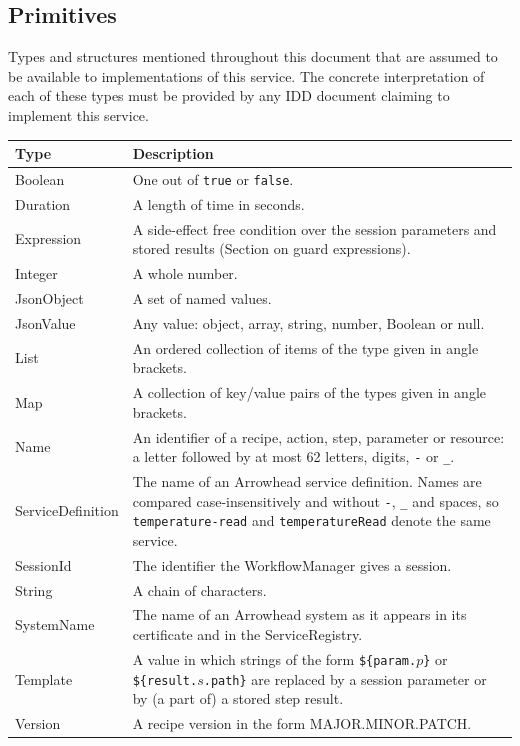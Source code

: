\documentclass[a4paper]{arrowhead}
\newcommand{\pdef}[1]{{\textcolor{ArrowheadGrey}{#1\label{sec:model:primitives:#1}\label{sec:model:primitives:#1s}\label{sec:model:primitives:#1es}}}}
\begin{document}
\subsection{Primitives}
\label{sec:model:primitives}
Types and structures mentioned throughout this document that are assumed to be available to implementations of this
service. The concrete interpretation of each of these types must be provided by any IDD document claiming to implement
this service.

{\small
\begin{longtable}{|p{3.2cm}|p{12.6cm}|}

\hline
\rowcolor{gray!33} Type & Description \\ \hline
\endhead
\pdef{Boolean} & One out of \texttt{true} or \texttt{false}. \\ \hline
\pdef{Duration} & A length of time in seconds. \\ \hline
\pdef{Expression} & A side-effect free condition over the session parameters and stored results (Section on guard expressions). \\ \hline
\pdef{Integer} & A whole number. \\ \hline
\pdef{JsonObject} & A set of named values. \\ \hline
\pdef{JsonValue} & Any value: object, array, string, number, Boolean or null. \\ \hline
\pdef{List} & An ordered collection of items of the type given in angle brackets. \\ \hline
\pdef{Map} & A collection of key/value pairs of the types given in angle brackets. \\ \hline
\pdef{Name} & An identifier of a recipe, action, step, parameter or resource: a letter followed by at most 62 letters, digits, \texttt{-} or \texttt{\_}. \\ \hline
\pdef{ServiceDefinition} & The name of an Arrowhead service definition. Names are compared case-insensitively and without \texttt{-}, \texttt{\_} and spaces, so \texttt{temperature-read} and \texttt{temperatureRead} denote the same service. \\ \hline
\pdef{SessionId} & The identifier the WorkflowManager gives a session. \\ \hline
\pdef{String} & A chain of characters. \\ \hline
\pdef{SystemName} & The name of an Arrowhead system as it appears in its certificate and in the ServiceRegistry. \\ \hline
\pdef{Template} & A value in which strings of the form \texttt{\$\{param.$p$\}} or \texttt{\$\{result.$s$.path\}} are replaced by a session parameter or by (a part of) a stored step result. \\ \hline
\pdef{Version} & A recipe version in the form MAJOR.MINOR.PATCH. \\ \hline
\end{longtable}
}
\end{document}
